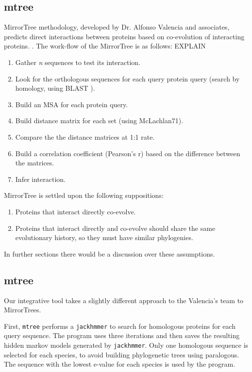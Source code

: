 \documentclass[11pt]{article}
\begin{document}
\subsection{mtree}
MirrorTree methodology, developed by Dr. Alfonso Valencia and associates, predicts direct interactions between proteins based on co-evolution of interacting proteins. \cite{Pazos2001}. The work-flow of the MirrorTree is as follows: EXPLAIN
\begin{enumerate}
\setlength{\itemsep}{1pt}
	\item Gather \textit{n} sequences to test its interaction.
	\item Look for the orthologous sequences for each query protein query (search by homology, using BLAST \cite{BLAST}).
	\item Build an MSA for each protein query.
	\item Build distance matrix for each set (using McLachlan71).
	\item Compare the the distance matrices at 1:1 rate.
	\item Build a correlation coefficient (Pearson's r) based on the difference between the matrices.
	\item Infer interaction.
\end{enumerate}
MirrorTree is settled upon the following suppositions:
\begin{enumerate}
\setlength{\itemsep}{1pt}
	\item Proteins that interact directly co-evolve.
	\item Proteins that interact directly and co-evolve should share the same evolutionary history, so they must have similar phylogenies.
\end{enumerate}
In further sections there would be a discussion over these assumptions.

\subsection{mtree}
Our integrative tool takes a slightly different approach to the Valencia's team to MirrorTrees. 

First, \texttt{mtree} performs a \texttt{jackhmmer} to search for homologous proteins for each query sequence. The program uses three iterations and then saves the resulting hidden markov models generated by \texttt{jackhmmer}. Only one homologous sequence is selected for each species, to avoid building phylogenetic trees using paralogous. The sequence with the lowest e-value for each species is used by the program.
\end{document}
